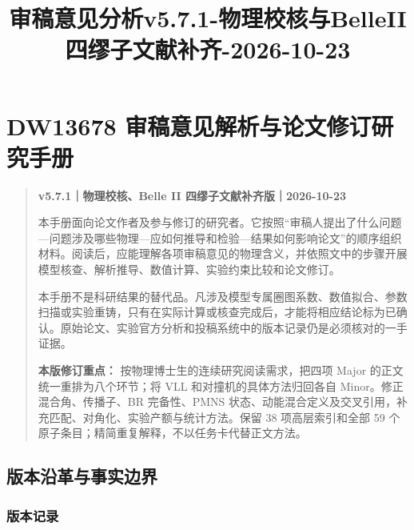 \documentclass[
]{article}
\title{审稿意见分析v5.7.1-物理校核与BelleII四缪子文献补齐-2026-10-23}
\author{}
\date{}
\begin{document}
\maketitle

\section{DW13678
审稿意见解析与论文修订研究手册}\label{dw13678-ux5ba1ux7a3fux610fux89c1ux89e3ux6790ux4e0eux8bbaux6587ux4feeux8ba2ux7814ux7a76ux624bux518c}

\begin{quote}
\textbf{v5.7.1｜物理校核、Belle II 四缪子文献补齐版｜2026-10-23}

本手册面向论文作者及参与修订的研究者。它按照``审稿人提出了什么问题---问题涉及哪些物理---应如何推导和检验---结果如何影响论文''的顺序组织材料。阅读后，应能理解各项审稿意见的物理含义，并依照文中的步骤开展模型核查、解析推导、数值计算、实验约束比较和论文修订。

本手册不是科研结果的替代品。凡涉及模型专属圈图系数、数值拟合、参数扫描或实验重铸，只有在实际计算或核查完成后，才能将相应结论标为已确认。原始论文、实验官方分析和投稿系统中的版本记录仍是必须核对的一手证据。

\textbf{本版修订重点：} 按物理博士生的连续研究阅读需求，把四项 Major
的正文统一重排为八个环节；将 VLL 和对撞机的具体方法归回各自
Minor。修正混合角、传播子、BR 完备性、PMNS
状态、动能混合定义及交叉引用，补充匹配、对角化、实验产额与统计方法。保留
38 项高层索引和全部 59
个原子条目；精简重复解释，不以任务卡代替正文方法。
\end{quote}

\subsection{版本沿革与事实边界}\label{ux7248ux672cux6cbfux9769ux4e0eux4e8bux5b9eux8fb9ux754c}

\subsubsection{版本记录}\label{ux7248ux672cux8bb0ux5f55}
\end{document}
